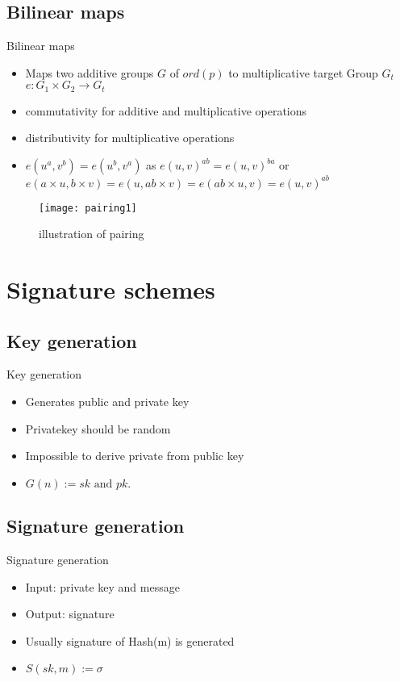 \documentclass{beamer}
\begin{document}
\subsection{Bilinear maps}
\begin{frame}{Bilinear maps}
	\begin{itemize}
		\item Maps two additive groups $G$ of $ord(p)$ to multiplicative target Group $G_t$ $e: G_1 \times G_2 \rightarrow G_t$
		\item commutativity for additive and multiplicative operations
		\item distributivity for multiplicative operations
		\item $e(u^a,v^b) = e(u^b,v^a)$ as $e(u,v)^{ab} = e(u,v)^{ba}$ or $e(a\times{u},b\times{v}) = e(u,ab\times{v}) = e(ab\times{u},v) = e(u,v)^{ab}$
	\end{itemize}
	\begin{figure}[hbt!]
		\centering
		\texttt{[image: pairing1]}
		\caption{illustration of pairing}
	\end{figure}
\end{frame}
\section{Signature schemes}
\subsection{Key generation}
\begin{frame}{Key generation}
	\begin{itemize}
	\item Generates public and private key
	\item Privatekey should be random
	\item Impossible to derive private from public key
	\item $G(n) := sk \text{ and } pk.$
	\end{itemize}
\end{frame}
\subsection{Signature generation}
\begin{frame}{Signature generation}
	\begin{itemize}
		\item Input: private key and message
		\item Output: signature
		\item Usually signature of Hash(m) is generated
		\item $S(sk, m) := \sigma$
	\end{itemize}
\end{frame}
\end{document}

